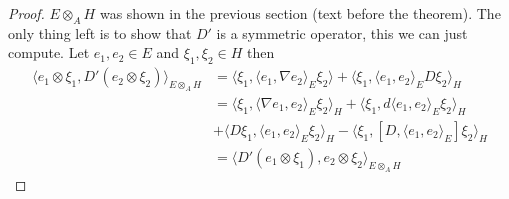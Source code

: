 \documentclass[a4paper]{article}
\theoremstyle{definition}
\theoremstyle{definition}
\theoremstyle{definition}
\theoremstyle{theorem}
\theoremstyle{theorem}
\theoremstyle{theorem}
\theoremstyle{definition}
\begin{document}
\begin{proof}
    $E\otimes _A H$ was shown in the previous section (text before the
    theorem). The only thing left is to show that $D'$ is a symmetric
    operator, this we can just compute. Let $e_1, e_2 \in E$ and $\xi _1,
    \xi _2 \in H$ then
    \begin{align*}
        \langle e_1 \otimes \xi _1, D'(e_2 \otimes \xi_2)\rangle _{E\otimes _A H} &=
        \langle \xi _1, \langle e_1, \nabla e_2\rangle _E  \xi _2\rangle  + \langle \xi _1 , \langle e_1, e_2\rangle _E D\xi
        _2\rangle _H \\
        &= \langle \xi _1, \langle \nabla e_1, e_2\rangle _E \xi _2\rangle _H + \langle \xi _1, d\langle e_1, e_2\rangle  _E
        \xi _2\rangle _H \\
        &+ \langle D\xi _1,\langle e_1, e_2\rangle _E \xi _2\rangle _H - \langle \xi _1, [D, \langle e_1, e_2\rangle _E] \xi
        _2 \rangle _H \\
        &= \langle D'(e_1 \otimes \xi _1), e_2 \otimes \xi _2\rangle _{E \otimes _A H}
    \end{align*}
\end{proof}
\end{document}

